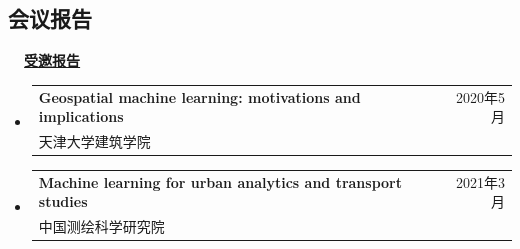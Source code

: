 \documentclass[A4,11pt]{article}
\makeatletter
\newcommand{\CVSubheading}[4]{
  \vspace{-2pt}\item
    \begin{tabular*}{0.97\textwidth}[t]{l@{\extracolsep{\fill}}r}
      \textbf{#1} & #2 \\
      \small#3 & \small #4 \\
    \end{tabular*}\vspace{-7pt}
}
\newcommand{\CVSubHeadingListStart}{\begin{itemize}[leftmargin=0.5cm, label={}]}
\newcommand{\CVSubHeadingListEnd}{\end{itemize}}
\makeatother
\begin{document}
\begin{CJK*}{UTF8}{gbsn}

\section{会议报告}
\noindent \textbf{\ \ \underline{受邀报告}}
  \CVSubHeadingListStart
    \CVSubheading
      {Geospatial machine learning: motivations and implications}{2020年5月}
      {天津大学建筑学院}{}
    \CVSubheading
      {Machine learning for urban analytics and transport studies}{2021年3月}
      {中国测绘科学研究院}{}
  \CVSubHeadingListEnd


\end{CJK*}
\end{document}
